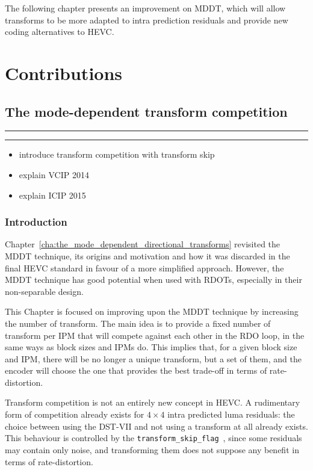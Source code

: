 \documentclass[11pt,a4paper,openright,twoside]{book}
\providecommand{\chaptertoc}{
	\startcontents[chapters]
	\hrule
	\vspace{1em}
	\printcontents[chapters]{}{1}{{\bf\large Contents}}
	\hrule
}
\numberwithin{equation}{section} %
\numberwithin{figure}{section} %
\numberwithin{table}{section} %
\begin{document}
The following chapter presents an improvement on \ac{MDDT}, which will allow
transforms to be more adapted to intra prediction residuals and provide new
coding alternatives to \ac{HEVC}.

\part{Contributions}
\label{prt:contributions}

\chapter{The mode-dependent transform competition}
\label{cha:the_mode_dependent_transform_competition}
\chaptertoc

\begin{itemize}
	\item introduce transform competition with transform
		skip~\cite{JCTVC-F077, JCTVC-H0208}
	\item explain VCIP 2014~\cite{arrufat-14-transform-competition-rdot}
	\item explain ICIP 2015~\cite{arrufat-15-mdtc}
\end{itemize}

\section{Introduction}
\label{sec:introduction_mdtc}

Chapter~\ref{cha:the_mode_dependent_directional_transforms} revisited the
\acf{MDDT} technique, its origins and motivation and how it was discarded in
the final \ac{HEVC} standard in favour of a more simplified approach.
However, the \ac{MDDT} technique has good potential when used with \acp{RDOT},
especially in their non-separable design.

This Chapter is focused on improving upon the \ac{MDDT} technique by
increasing the number of transform.
The main idea is to provide a fixed number of transform per \acf{IPM} that
will compete against each other in the \ac{RDO} loop, in the same ways as
block sizes and \acp{IPM} do.
This implies that, for a given block size and \ac{IPM}, there will be no
longer a unique transform, but a set of them, and the encoder will choose the
one that provides the best trade-off in terms of rate-distortion.

Transform competition is not an entirely new concept in \ac{HEVC}.
A rudimentary form of competition already exists for $4\times4$ intra
predicted luma residuals: the choice between using the \ac{DST}-VII and not
using a transform at all already exists.
This behaviour is controlled by the
\texttt{transform\_skip\_flag}~\cite{JCTVC-F077, JCTVC-H0208}, since some
residuals may contain only noise, and transforming them does not suppose any
benefit in terms of rate-distortion.
\end{document}
